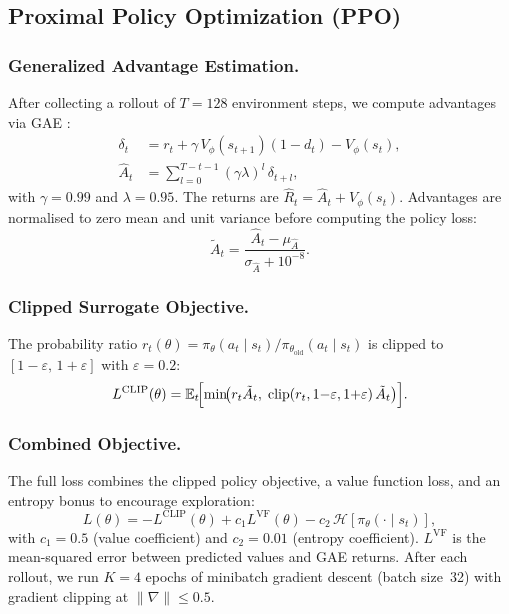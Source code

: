 \documentclass[10pt, letterpaper, twocolumn]{article}
\newcommand{\E}{\mathbb{E}}
\newcommand{\eps}{\varepsilon}
\begin{document}
\subsection{Proximal Policy Optimization (PPO)}
\label{sec:ppo}

\subsubsection{Generalized Advantage Estimation.}
After collecting a rollout of $T = 128$ environment steps, we compute
advantages via GAE \citep{schulman2015gae}:
\begin{align}
  \delta_t     &= r_t + \gamma\, V_\phi(s_{t+1})(1-d_t) - V_\phi(s_t), \\
  \hat{A}_t    &= \sum_{l=0}^{T-t-1} (\gamma\lambda)^l\,\delta_{t+l},
  \label{eq:gae}
\end{align}
with $\gamma = 0.99$ and $\lambda = 0.95$.  The returns are $\hat{R}_t =
\hat{A}_t + V_\phi(s_t)$.  Advantages are normalised to zero mean and unit
variance before computing the policy loss:
\begin{equation}
  \tilde{A}_t = \frac{\hat{A}_t - \mu_{\hat{A}}}{\sigma_{\hat{A}} + 10^{-8}}.
\end{equation}

\subsubsection{Clipped Surrogate Objective.}
The probability ratio $r_t(\theta) = \pi_\theta(a_t \mid s_t) /
\pi_{\theta_\text{old}}(a_t \mid s_t)$ is clipped to $[1-\eps,\, 1+\eps]$
with $\eps = 0.2$:
\begin{equation}
  L^{\text{CLIP}}(\theta) = \E_t\!\Bigl[
    \min\!\bigl(r_t \tilde{A}_t,\;
               \text{clip}(r_t, 1{-}\eps, 1{+}\eps)\,\tilde{A}_t\bigr)
  \Bigr].
  \label{eq:ppo_clip}
\end{equation}

\subsubsection{Combined Objective.}
The full loss combines the clipped policy objective, a value function
loss, and an entropy bonus to encourage exploration:
\begin{equation}
  L(\theta) = -L^{\text{CLIP}}(\theta)
              + c_1 L^{\text{VF}}(\theta)
              - c_2\, \mathcal{H}[\pi_\theta(\cdot \mid s_t)],
  \label{eq:ppo_total}
\end{equation}
with $c_1 = 0.5$ (value coefficient) and $c_2 = 0.01$ (entropy
coefficient).  $L^{\text{VF}}$ is the mean-squared error between predicted
values and GAE returns.  After each rollout, we run $K = 4$ epochs of
minibatch gradient descent (batch size~32) with gradient clipping at
$\|\nabla\| \leq 0.5$.
\end{document}
